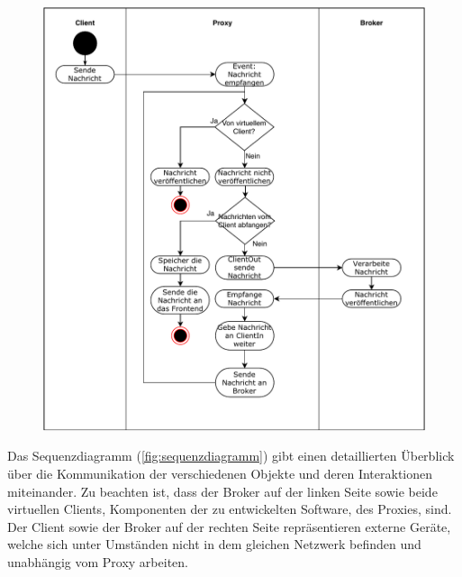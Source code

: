     \begin{figure}[!h]%
        \centering
        \includegraphics[width=14cm]{tex/bilder/4_konzept/Activity_Message.pdf}
        \label{fig:aktivitaetsdiagramm_message}
    \end{figure}
    
    Das Sequenzdiagramm (\ref{fig:sequenzdiagramm}) gibt einen detaillierten Überblick über die Kommunikation der verschiedenen Objekte und deren Interaktionen miteinander.
    Zu beachten ist, dass der Broker auf der linken Seite sowie beide virtuellen Clients, Komponenten der zu entwickelten Software, des Proxies, sind.
    Der Client sowie der Broker auf der rechten Seite repräsentieren externe Geräte, welche sich unter Umständen nicht in dem gleichen Netzwerk befinden und unabhängig vom Proxy arbeiten.
    
